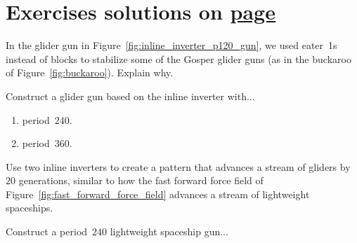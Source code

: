 \section*{Exercises \hfill \normalfont\textsf{\small solutions on \hyperlink{solutions_periodic_circuitry}{page \pageref{solutions_periodic_circuitry}}}}
\label{sec:periodic_exercises}
\vspace*{-0.4cm}\hrulefill\vspace*{-0.3cm}\footnotesize\begin{multicols}{2}\vspace*{-0.4cm}\raggedcolumns{}
\setlength{\parskip}{0pt}


\begin{problem}\label{exer:inline_inverter_gun_why_buckaroo}
	In the glider gun in Figure~\ref{fig:inline_inverter_p120_gun}, we used eater~1s instead of blocks to stabilize some of the Gosper glider guns (as in the buckaroo of Figure~\ref{fig:buckaroo}). Explain why.
\end{problem}


\mfilbreak


\begin{problem}\label{exer:inline_inverter_gun_high_period}
	Construct a glider gun based on the inline inverter with...\smallskip
	
	\begin{enumerate}[label=\bf\color{ocre}(\alph*)]
		\item period~$240$.
			
		\item period~$360$.
	\end{enumerate}
\end{problem}


\mfilbreak


\begin{problem}\label{exer:inline_inverter_advancer}
	Use two inline inverters to create a pattern that advances a stream of gliders by $20$ generations, similar to how the fast forward force field of Figure~\ref{fig:fast_forward_force_field} advances a stream of lightweight spaceships.
\end{problem}
	
	
\mfilbreak
	
	
\begin{problem}\label{exer:inline_inverter_lwss_gun}
	Construct a period~$240$ lightweight spaceship gun...\smallskip
	

\end{problem}
\end{multicols}

